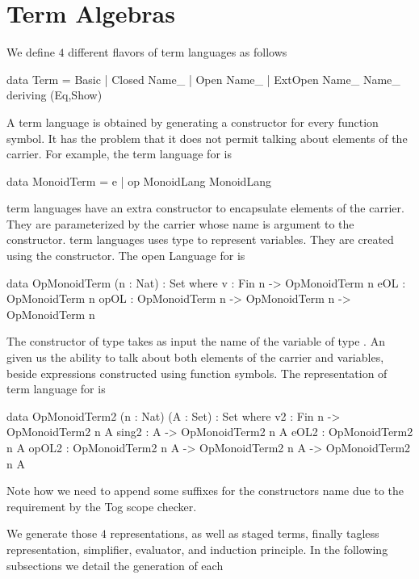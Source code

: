\section{Term Algebras}
We define $4$ different flavors of term languages as follows 
\begin{hscode}
data Term = Basic
                  | Closed Name_
                  | Open Name_
                  | ExtOpen Name_ Name_ deriving (Eq,Show)
\end{hscode}
A  term language is obtained by generating a constructor for every function symbol. It has the problem that it does not permit talking about elements of the carrier. For example, the  term language for  is 
\begin{togcode}
data MonoidTerm = e | op MonoidLang MonoidLang
\end{togcode}
 term languages have an extra constructor  to encapsulate elements of the carrier. They are parameterized by the carrier whose name is argument to the  constructor. 
 term languages uses  type to represent variables. They are created using the  constructor. The open Language for  is 
\begin{togcode}
data OpMonoidTerm (n : Nat) : Set where
  v : Fin n -> OpMonoidTerm n
  eOL : OpMonoidTerm n
  opOL : OpMonoidTerm n -> OpMonoidTerm n -> OpMonoidTerm n
\end{togcode}
The constructor  of type  takes as input the name of the variable of type . 
An  given us the ability to talk about both elements of the carrier and variables, beside expressions constructed using function symbols. The representation of  term language for  is 
\begin{togcode}
data OpMonoidTerm2 (n : Nat) (A : Set) : Set where
  v2 : Fin n -> OpMonoidTerm2 n A
  sing2 : A -> OpMonoidTerm2 n A
  eOL2 : OpMonoidTerm2 n A
  opOL2 : OpMonoidTerm2 n A -> OpMonoidTerm2 n A -> OpMonoidTerm2 n A
\end{togcode}
Note how we need to append some suffixes for the constructors name due to the requirement by the Tog scope checker. 

We generate those $4$ representations, as well as staged terms, finally tagless representation, simplifier, evaluator, and induction principle. In the following subsections we detail the generation of each 

